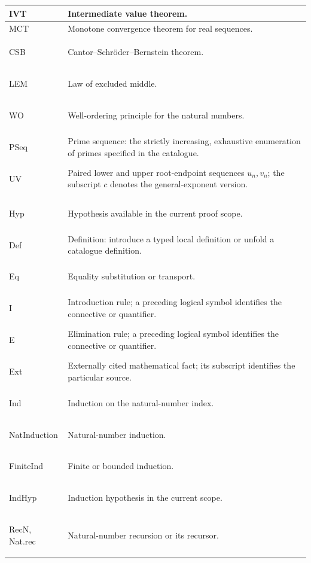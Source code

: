 \documentclass[11pt,reqno]{amsart}
\makeatletter
\theoremstyle{blueplain}
\newcounter{type}
\newcommand{\defref}[1]{\hyperref[#1]{Definition~\ref*{#1}}}
\numberwithin{equation}{section}
\DeclareRobustCommand{\defref}[1]{%
  \hyperlink{def:#1}{\ensuremath{\csname PredicateName@#1\endcsname}}}
\def\defref#1{#1}%
\def\hyperlink#1#2{#2}}
\makeatother
\begin{document}
\begin{longtable}[c]{|>{\centering\arraybackslash}m{}|>{\centering\arraybackslash}m{}|}
\hypertarget{abbr:IVT}{}\defref{IVT} & Intermediate value theorem.\\\hline
\hypertarget{abbr:MCT}{}\defref{MCT} & Monotone convergence theorem for real sequences.\\\hline
\hypertarget{abbr:CSB}{}\defref{CSB} & Cantor--Schr\"oder--Bernstein theorem.\\\hline
\hypertarget{abbr:LEM}{}\defref{LEM} & Law of excluded middle.\\\hline
\hypertarget{abbr:WO}{}\defref{WO} & Well-ordering principle for the natural numbers.\\\hline
\hypertarget{abbr:PSeq}{}\defref{PSeq} & Prime sequence: the strictly increasing, exhaustive enumeration of primes specified in the catalogue.\\\hline
\hypertarget{abbr:UV}{}\defref{UV} & Paired lower and upper root-endpoint sequences $u_n,v_n$; the subscript $c$ denotes the general-exponent version.\\\hline
\multicolumn{2}{|c|}{\textbf{Shortened proof and predicate tags}}\\\hline
\hypertarget{abbr:Hyp}{}\defref{Hyp} & Hypothesis available in the current proof scope.\\\hline
\hypertarget{abbr:Def}{}\defref{Def} & Definition: introduce a typed local definition or unfold a catalogue definition.\\\hline
\hypertarget{abbr:Eq}{}\defref{Eq} & Equality substitution or transport.\\\hline
\hypertarget{abbr:I}{}\defref{I} & Introduction rule; a preceding logical symbol identifies the connective or quantifier.\\\hline
\hypertarget{abbr:E}{}\defref{E} & Elimination rule; a preceding logical symbol identifies the connective or quantifier.\\\hline
\hypertarget{abbr:Ext}{}\defref{Ext} & Externally cited mathematical fact; its subscript identifies the particular source.\\\hline
\hypertarget{abbr:Ind}{}\defref{Ind} & Induction on the natural-number index.\\\hline
\hypertarget{abbr:NatInduction}{}\defref{NatInduction} & Natural-number induction.\\\hline
\hypertarget{abbr:FiniteInd}{}\defref{FiniteInd} & Finite or bounded induction.\\\hline
\hypertarget{abbr:IndHyp}{}\defref{IndHyp} & Induction hypothesis in the current scope.\\\hline
\hypertarget{abbr:Rec}{}\defref{RecN}, \defref{Nat.rec} & Natural-number recursion or its recursor.\\\hline

\end{longtable}
\end{document}
